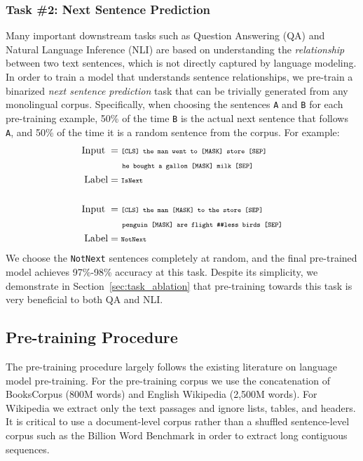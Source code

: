 \subsubsection{Task \#2: Next Sentence Prediction}
Many important downstream tasks such as Question Answering (QA) and Natural Language Inference (NLI) are based on understanding the {\it relationship} between two text sentences, which is not directly captured by language modeling. In order to train a model that understands sentence relationships, we pre-train a binarized {\it next sentence prediction} task that can be trivially generated from any monolingual corpus. Specifically, when choosing the sentences {\tt A} and {\tt B} for each pre-training example, 50\% of the time {\tt B} is the actual next sentence that follows {\tt A}, and 50\% of the time it is a random sentence from the corpus. For example:
\begin{align*}
\text{Input\;} &= \text{\tt {\scriptsize [CLS] the man went to [MASK] store [SEP]}} \\ 
& \text{\tt {\scriptsize \;\;\;\;\;\;\;he bought a gallon [MASK] milk [SEP]}}\\
\text{Label} &= \text{\tt {\scriptsize IsNext}} \\
\\
\text{Input\;} &= \text{\tt {\scriptsize [CLS] the man [MASK] to the store [SEP]}}\\
&\text{\tt {\scriptsize \;\;\;\;\;\;\;penguin [MASK] are flight \#\#less birds [SEP]}}\\
\text{Label} &= \text{\tt {\scriptsize NotNext}}
\end{align*}
We choose the {\tt {\small NotNext}} sentences completely at random, and the final pre-trained model achieves 97\%-98\% accuracy at this task. Despite its simplicity, we demonstrate in Section~\ref{sec:task_ablation} that pre-training towards this task is very beneficial to both QA and NLI.

\subsection{Pre-training Procedure}
\label{sec:pretraining_procedure}

The pre-training procedure largely follows the existing literature on language model pre-training. For the pre-training corpus we use the concatenation of BooksCorpus (800M words) \cite{zhu:2015} and English Wikipedia (2,500M words). For Wikipedia we extract only the text passages and ignore lists, tables, and headers. It is critical to use a document-level corpus rather than a shuffled sentence-level corpus such as the Billion Word Benchmark \cite{chelba-etal:2013:_one} in order to extract long contiguous sequences.

